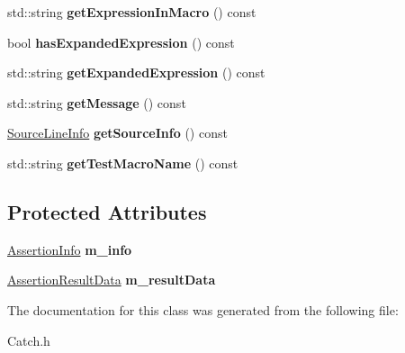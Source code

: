 \begin{DoxyCompactItemize}
\item 
\hypertarget{class_catch_1_1_assertion_result_ac368a7490af7669decd58efea7d7dc54}{std\-::string {\bfseries get\-Expression\-In\-Macro} () const }\label{class_catch_1_1_assertion_result_ac368a7490af7669decd58efea7d7dc54}

\item 
\hypertarget{class_catch_1_1_assertion_result_a122c369bd49430a304e3eaebdf184f36}{bool {\bfseries has\-Expanded\-Expression} () const }\label{class_catch_1_1_assertion_result_a122c369bd49430a304e3eaebdf184f36}

\item 
\hypertarget{class_catch_1_1_assertion_result_a675d074588875eb62b0b6e36e05d65e6}{std\-::string {\bfseries get\-Expanded\-Expression} () const }\label{class_catch_1_1_assertion_result_a675d074588875eb62b0b6e36e05d65e6}

\item 
\hypertarget{class_catch_1_1_assertion_result_a9793bfc4d24678c8a013bda84a5aa905}{std\-::string {\bfseries get\-Message} () const }\label{class_catch_1_1_assertion_result_a9793bfc4d24678c8a013bda84a5aa905}

\item 
\hypertarget{class_catch_1_1_assertion_result_a68b73fe982a97fe6432af679af1a2dad}{\hyperlink{struct_catch_1_1_source_line_info}{Source\-Line\-Info} {\bfseries get\-Source\-Info} () const }\label{class_catch_1_1_assertion_result_a68b73fe982a97fe6432af679af1a2dad}

\item 
\hypertarget{class_catch_1_1_assertion_result_a2901d41b199258ff6a44571b147169dd}{std\-::string {\bfseries get\-Test\-Macro\-Name} () const }\label{class_catch_1_1_assertion_result_a2901d41b199258ff6a44571b147169dd}

\end{DoxyCompactItemize}
\subsection*{Protected Attributes}
\begin{DoxyCompactItemize}
\item 
\hypertarget{class_catch_1_1_assertion_result_a3e7236f73a51d6fc8bb9dfdefcee7772}{\hyperlink{struct_catch_1_1_assertion_info}{Assertion\-Info} {\bfseries m\-\_\-info}}\label{class_catch_1_1_assertion_result_a3e7236f73a51d6fc8bb9dfdefcee7772}

\item 
\hypertarget{class_catch_1_1_assertion_result_add3455b8bbedb0d643e18da67c66b4f7}{\hyperlink{struct_catch_1_1_assertion_result_data}{Assertion\-Result\-Data} {\bfseries m\-\_\-result\-Data}}\label{class_catch_1_1_assertion_result_add3455b8bbedb0d643e18da67c66b4f7}

\end{DoxyCompactItemize}


The documentation for this class was generated from the following file\-:\begin{DoxyCompactItemize}
\item 
Catch.\-h\end{DoxyCompactItemize}
